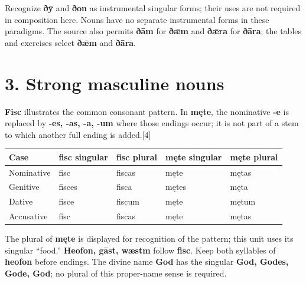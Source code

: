 Recognize \textbf{ðȳ} and \textbf{ðon} as instrumental singular forms; their uses are not required in composition here. Nouns have no separate instrumental forms in these paradigms. The source also permits \textbf{ðām} for \textbf{ðǣm} and \textbf{ðǣra} for \textbf{ðāra}; the tables and exercises select \textbf{ðǣm} and \textbf{ðāra}.

\section*{3. Strong masculine nouns}

\textbf{Fisc} illustrates the common consonant pattern. In \textbf{męte}, the nominative \textbf{-e} is replaced by \textbf{-es, -as, -a, -um} where those endings occur; it is not part of a stem to which another full ending is added.[4]

\par\begingroup
\fontsize{10.5}{13.2}\selectfont
\setlength{\LTleft}{0pt}\setlength{\LTright}{\fill}
\noindent
\begin{tabular}{@{}>{\raggedright\arraybackslash}p{22.0mm}>{\raggedright\arraybackslash}p{22.688mm}>{\raggedright\arraybackslash}p{22.688mm}>{\raggedright\arraybackslash}p{22.688mm}>{\raggedright\arraybackslash}p{22.688mm}@{}}
\toprule
\textbf{Case} & \textbf{fisc singular} & \textbf{fisc plural} & \textbf{męte singular} & \textbf{męte plural} \\
\midrule
Nominative & fisc & fiscas & męte & mętas \\
Genitive & fisces & fisca & mętes & męta \\
Dative & fisce & fiscum & męte & mętum \\
Accusative & fisc & fiscas & męte & mętas \\
\bottomrule
\end{tabular}
\par\endgroup

The plural of \textbf{męte} is displayed for recognition of the pattern; this unit uses its singular “food.” \textbf{Heofon, gāst, wæstm} follow \textbf{fisc}. Keep both syllables of \textbf{heofon} before endings. The divine name \textbf{God} has the singular \textbf{God, Godes, Gode, God}; no plural of this proper-name sense is required.

